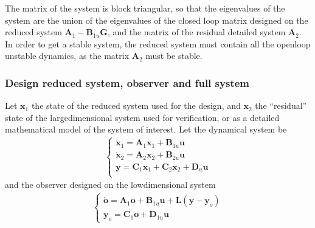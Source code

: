 \documentclass[letterpaper,10pt,english]{jupyterBook}
\begin{document}
\sphinxAtStartPar
The matrix of the system is block triangular, so that the eigenvalues of the system are the union of the eigenvalues of the closed loop matrix designed on the reduced system \(\mathbf{A}_1 - \mathbf{B}_{1u} \mathbf{G}\), and the matrix of the residual detailed system \(\mathbf{A}_2\). In order to get a stable system, the reduced system must contain all the open\sphinxhyphen{}loop unstable dynamics, as the matrix \(\mathbf{A}_2\) must be stable.


\subsubsection{Design reduced system, observer and full system}
\label{\detokenize{ch/control/optimal-control-regulator-observer:design-reduced-system-observer-and-full-system}}\label{\detokenize{ch/control/optimal-control-regulator-observer:control-controller-observer-spillover-reduced-sys-observer}}
\sphinxAtStartPar
Let \(\mathbf{x}_1\) the state of the reduced system used for the design, and \(\mathbf{x}_2\) the “residual” state of the large\sphinxhyphen{}dimensional system used for verification, or as a detailed mathematical model of the system of interest. Let the dynamical system be
\begin{equation*}
\begin{split}\begin{cases}
  \dot{\mathbf{x}}_1 = \mathbf{A}_1 \mathbf{x}_1 + \mathbf{B}_{1u} \mathbf{u} \\
  \dot{\mathbf{x}}_2 = \mathbf{A}_2 \mathbf{x}_2 + \mathbf{B}_{2u} \mathbf{u} \\
  \mathbf{y}         = \mathbf{C}_1 \mathbf{x}_1 + \mathbf{C}_2 \mathbf{x}_2 + \mathbf{D}_{u} \mathbf{u}  \\
\end{cases}\end{split}
\end{equation*}
\sphinxAtStartPar
and the observer designed on the low\sphinxhyphen{}dimensional system
\begin{equation*}
\begin{split}\begin{cases}
  \dot{\mathbf{o}} = \mathbf{A}_1 \mathbf{o} + \mathbf{B}_{1u} \mathbf{u} + \mathbf{L} \left( \mathbf{y} - \mathbf{y}_o \right) \\
  \mathbf{y}_o     = \mathbf{C}_1 \mathbf{o} + \mathbf{D}_{1u} \mathbf{u}
\end{cases}\end{split}
\end{equation*}
\end{document}

